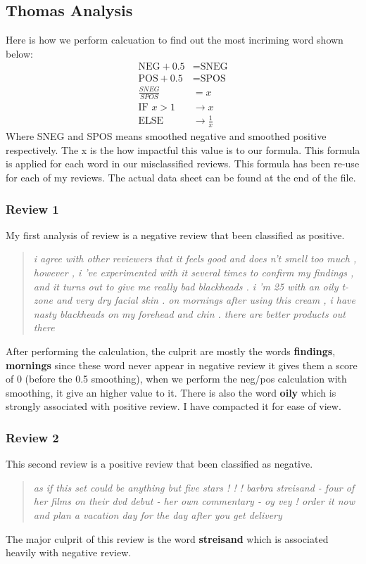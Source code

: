 \documentclass[runningheads]{llncs}
\begin{document}
    \subsection{Thomas Analysis}
    Here is how we perform calcuation to find out the most incriming word shown below:
    $$
    \begin{aligned}
        \text{NEG} + 0.5 &= \text{SNEG}\\
        \text{POS} + 0.5 &= \text{SPOS}\\
        \frac{SNEG}{SPOS} &= x\\
        \text{IF } x > 1 &\rightarrow x\\
        \text{ELSE } &\rightarrow \frac{1}{x}
    \end{aligned}
    $$
    Where SNEG and SPOS means smoothed negative and smoothed positive respectively. The x is the how impactful this value is to our formula. This formula is applied for each word in our misclassified reviews. This formula has been re-use for each of my reviews. The actual data sheet can be found at the end of the file.
    \subsubsection{Review 1}
    My first analysis of review is a negative review that been classified as positive.
    \begin{quotation}
        \textit{i agree with other reviewers that it feels good and does n't smell too much , however , i 've experimented with it several times to confirm my findings , and it turns out to give me really bad blackheads . i 'm 25 with an oily t-zone and very dry facial skin . on mornings after using this cream , i have nasty blackheads on my forehead and chin . there are better products out there} 
    \end{quotation}
    After performing the calculation, the culprit are mostly the words \textbf{findings}, \textbf{mornings} since these word never appear in negative review it gives them a score of 0 (before the 0.5 smoothing), when we perform the neg/pos calculation with smoothing, it give an higher value to it. There is also the word \textbf{oily} which is strongly associated with positive review. I have compacted it for ease of view.
    \subsubsection{Review 2}
    This second review is a positive review that been classified as negative.
    \begin{quotation}
        \textit{as if this set could be anything but five stars ! ! ! barbra streisand - four of her films on their dvd debut - her own commentary - oy vey ! order it now and plan a vacation day for the day after you get delivery }
    \end{quotation}
    The major culprit of this review is the word \textbf{streisand} which is associated heavily with negative review. 
\end{document}
